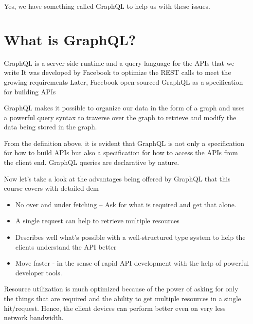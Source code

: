 \documentclass[../main.tex]{subfiles}
\begin{document}
Yes, we have something called GraphQL to help us with these issues.

\section{What is GraphQL?}
GraphQL is a server-side runtime and a query language for the APIs that we write
It was developed by Facebook to optimize the REST calls to meet the growing requirements
Later, Facebook open-sourced GraphQL as a specification for building APIs

GraphQL makes it possible to organize our data in the form of a graph and uses a powerful query syntax to traverse over the graph to retrieve and modify the data being stored in the graph.

From the definition above, it is evident that GraphQL is not only a specification for how to build APIs but also a specification for how to access the APIs from the client end.
GraphQL queries are declarative by nature.

Now let’s take a look at the advantages being offered by GraphQL that this course covers with detailed dem
\begin{itemize}
  \item {No over and under fetching – Ask for what is required and get that alone.}
  \item {A single request can help to retrieve multiple resources}
  \item {Describes well what’s possible with a well-structured type system to help the clients understand the API better}
  \item {Move faster - in the sense of rapid API development with the help of powerful developer tools.}
\end{itemize}

Resource utilization is much optimized because of the power of asking for only the things that are required and the ability to get multiple resources in a single hit/request.
Hence, the client devices can perform better even on very less network bandwidth.
\end{document}
